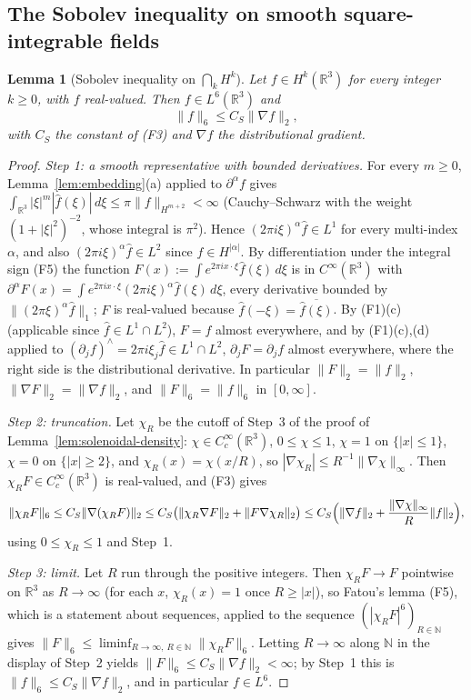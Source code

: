 \documentclass[11pt]{article}
\newtheorem{lemma}[theorem]{Lemma}
\theoremstyle{definition}
\theoremstyle{plain}
\newcommand{\R}{\mathbb R}
\newcommand{\norm}[1]{\lVert #1\rVert}
\begin{document}
\subsection{The Sobolev inequality on smooth square-integrable fields}

\begin{lemma}[Sobolev inequality on $\bigcap_kH^k$]\label{lem:sobolev-h1}
Let $f\in H^k(\R^3)$ for every integer $k\geq0$, with $f$ real-valued.  Then
$f\in L^6(\R^3)$ and
\[
 \norm f_6\leq C_S\norm{\nabla f}_2 ,
\]
with $C_S$ the constant of \textup{(F3)} and $\nabla f$ the distributional
gradient.
\end{lemma}

\begin{proof}
\emph{Step 1: a smooth representative with bounded derivatives.}  For every
$m\geq0$, Lemma~\ref{lem:embedding}(a)
applied to $\partial^\alpha f$ gives
$\int_{\R^3}|\xi|^m|\hat f(\xi)|\,d\xi\leq\pi\norm f_{H^{m+2}}<\infty$
(Cauchy--Schwarz with the weight $(1+|\xi|^2)^{-2}$, whose integral is
$\pi^2$).
Hence $(2\pi i\xi)^\alpha\hat f\in L^1$ for every multi-index $\alpha$, and
also $(2\pi i\xi)^\alpha\hat f\in L^2$ since $f\in H^{|\alpha|}$.  By
differentiation under the integral sign \textup{(F5)} the function
$F(x):=\int e^{2\pi ix\cdot\xi}\hat f(\xi)\,d\xi$ is in $C^\infty(\R^3)$ with
$\partial^\alpha F(x)=\int e^{2\pi ix\cdot\xi}(2\pi i\xi)^\alpha\hat f(\xi)\,d\xi$,
every derivative bounded by $\norm{(2\pi\xi)^\alpha\hat f}_1$; $F$ is
real-valued because $\hat f(-\xi)=\overline{\hat f(\xi)}$.  By
\textup{(F1)(c)} (applicable since $\hat f\in L^1\cap L^2$), $F=f$ almost
everywhere, and by \textup{(F1)(c),(d)} applied to $(\partial_jf)^\wedge
=2\pi i\xi_j\hat f\in L^1\cap L^2$, $\partial_jF=\partial_jf$ almost
everywhere, where the right side is the distributional derivative.  In
particular $\norm F_2=\norm f_2$, $\norm{\nabla F}_2=\norm{\nabla f}_2$, and
$\norm F_6=\norm f_6$ in $[0,\infty]$.

\emph{Step 2: truncation.}  Let $\chi_R$ be the cutoff of Step~3 of the proof
of Lemma~\ref{lem:solenoidal-density}: $\chi\in C_c^\infty(\R^3)$,
$0\leq\chi\leq1$, $\chi=1$ on $\{|x|\leq1\}$, $\chi=0$ on $\{|x|\geq2\}$, and
$\chi_R(x)=\chi(x/R)$, so $|\nabla\chi_R|\leq R^{-1}\norm{\nabla\chi}_\infty$.
Then $\chi_RF\in C_c^\infty(\R^3)$ is real-valued, and \textup{(F3)} gives
\[
 \norm{\chi_RF}_6\leq C_S\norm{\nabla(\chi_RF)}_2
 \leq C_S\bigl(\norm{\chi_R\nabla F}_2+\norm{F\nabla\chi_R}_2\bigr)
 \leq C_S\Bigl(\norm{\nabla f}_2
 +\frac{\norm{\nabla\chi}_\infty}{R}\norm f_2\Bigr),
\]
using $0\leq\chi_R\leq1$ and Step~1.

\emph{Step 3: limit.}  Let $R$ run through the positive integers.  Then
$\chi_RF\to F$ pointwise on $\R^3$ as $R\to\infty$ (for each $x$,
$\chi_R(x)=1$ once $R\geq|x|$), so Fatou's lemma \textup{(F5)}, which is a
statement about sequences, applied to the sequence
$(|\chi_RF|^6)_{R\in\mathbb N}$ gives
$\norm F_6\leq\liminf_{R\to\infty,\ R\in\mathbb N}\norm{\chi_RF}_6$.  Letting
$R\to\infty$ along $\mathbb N$ in the display of Step~2 yields
$\norm F_6\leq C_S\norm{\nabla f}_2<\infty$; by Step~1 this is
$\norm f_6\leq C_S\norm{\nabla f}_2$, and in particular $f\in L^6$.
\end{proof}
\end{document}
